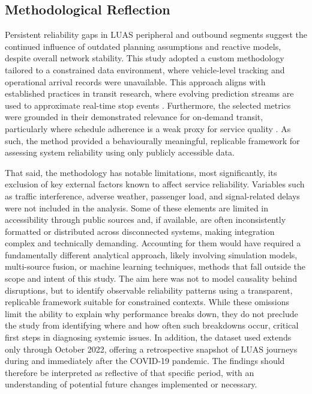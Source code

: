 \subsection*{Methodological Reflection}

    Persistent reliability gaps in LUAS peripheral and outbound segments suggest the continued influence of outdated planning assumptions and reactive models, despite overall network stability. This study adopted a custom methodology tailored to a constrained data environment, where vehicle-level tracking and operational arrival records were unavailable. This approach aligns with established practices in transit research, where evolving prediction streams are used to approximate real-time stop events \parencites{muller2001trip}{sun2016smart}. Furthermore, the selected metrics were grounded in their demonstrated relevance for on-demand transit, particularly where schedule adherence is a weak proxy for service quality \parencites{vanoort2011service}{tirachini2022headway}. As such, the method provided a behaviourally meaningful, replicable framework for assessing system reliability using only publicly accessible data.

    That said, the methodology has notable limitations, most significantly, its exclusion of key external factors known to affect service reliability. Variables such as traffic interference, adverse weather, passenger load, and signal-related delays were not included in the analysis. Some of these elements are limited in accessibility through public sources and, if available, are often inconsistently formatted or distributed across disconnected systems, making integration complex and technically demanding. Accounting for them would have required a fundamentally different analytical approach, likely involving simulation models, multi-source fusion, or machine learning techniques, methods that fall outside the scope and intent of this study. The aim here was not to model causality behind disruptions, but to identify observable reliability patterns using a transparent, replicable framework suitable for constrained contexts. While these omissions limit the ability to explain why performance breaks down, they do not preclude the study from identifying where and how often such breakdowns occur, critical first steps in diagnosing systemic issues. In addition, the dataset used extends only through October 2022, offering a retrospective snapshot of LUAS journeys during and immediately after the COVID-19 pandemic. The findings should therefore be interpreted as reflective of that specific period, with an understanding of potential future changes implemented or necessary.

